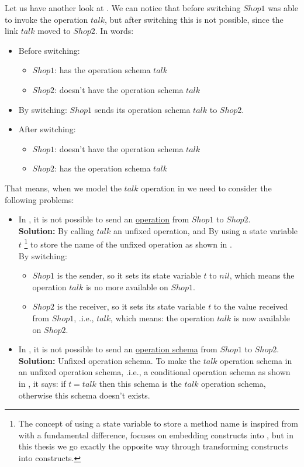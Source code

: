 Let us have another look at . We can notice that before switching $Shop1$ was able to invoke the operation $talk$, but after switching this is not possible, since the link $talk$ moved to $Shop2$. In \oz{} words:
\begin{itemize}
\item Before switching:
	\begin{itemize}
	\item $Shop1$: has the operation schema $talk$
	\item $Shop2$: doesn't have the operation schema $talk$
	\end{itemize}
\item By switching: $Shop1$ sends its operation schema $talk$ to $Shop2$.
\item After switching:
	\begin{itemize}
	\item $Shop1$: doesn't have the operation schema $talk$
	\item $Shop2$: has the operation schema $talk$
	\end{itemize}
\end{itemize}
That means, when we model the $talk$ operation in \oz{} we need to consider the following problems: 

\begin{itemize}
\item In \oz{}, it is not possible to send an \underline{operation} from $Shop1$ to $Shop2$.\\
\textbf{Solution:} By calling $talk$ an unfixed operation, and By using a state variable $t$ \footnote{The concept of using a state variable to store a method name is inspired from \cite{kenji} with a fundamental difference, \cite{kenji} focuses on embedding \picalc{} constructs into \oz{}, but in this thesis we go exactly the opposite way through transforming \oz{} constructs into \picalc{} constructs.} to store the name of the unfixed operation as shown in .\\
By switching:
\begin{itemize}
\item $Shop1$ is the sender, so it sets its state variable $t$ to $nil$, which means the operation $talk$ is no more available on $Shop1$.
\item $Shop2$ is the receiver, so it sets its state variable $t$ to the value received from $Shop1$, .i.e., $talk$, which means: the operation $talk$ is now available on $Shop2$.
\end{itemize}
\item In \oz{}, it is not possible to send an \underline{operation schema} from $Shop1$ to $Shop2$.\\
\textbf{Solution:} Unfixed operation schema. To make the $talk$ operation schema in  an unfixed operation schema, .i.e., a conditional operation schema as shown in , it says: if $t = talk$ then this schema is the $talk$ operation schema, otherwise this schema doesn't exists.

\end{itemize}



